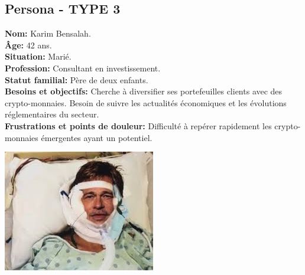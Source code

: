 \documentclass[a4paper,11pt]{article}
\begin{document}
\subsection{Persona - TYPE 3}
\begin{minipage}{0.6\textwidth} %
\textbf{Nom:} Karim Bensalah.\\
\textbf{Âge:} 42 ans.\\
\textbf{Situation:} Marié.\\
\textbf{Profession:} Consultant en investissement.\\
\textbf{Statut familial:} Père de deux enfants.\\
\textbf{Besoins et objectifs:} Cherche à diversifier ses portefeuilles clients avec des crypto-monnaies. Besoin de suivre les actualités économiques et les évolutions réglementaires du secteur.\\
\textbf{Frustrations et points de douleur:} Difficulté à repérer rapidement les crypto-monnaies émergentes ayant un potentiel.\\
\end{minipage}%
\hspace{1cm}
\begin{minipage}{0.3\textwidth} %
    \begin{center}
        \includegraphics[width=\textwidth]{images/Cbradpitt.jpeg} %
    \end{center}
\end{minipage}
\end{document}
